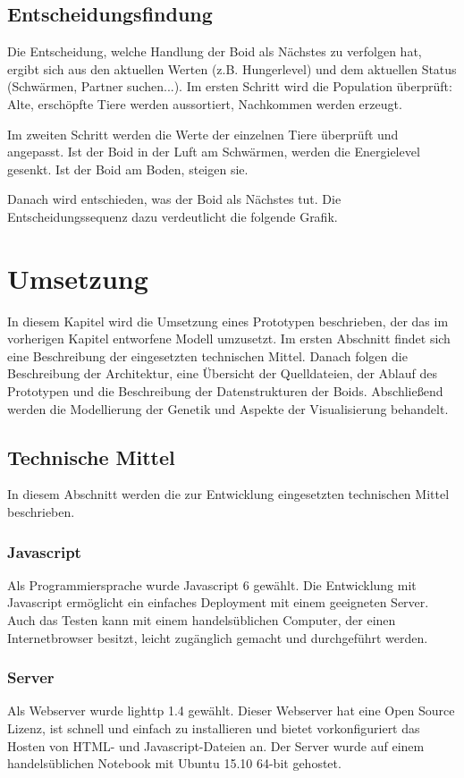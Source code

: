 \documentclass[draft=false
              ,paper=a4
              ,twoside=false
              ,fontsize=11pt
              ,headsepline
              ,BCOR10mm
              ,DIV11
              ,bibtotoc
              ,liststotoc
              ]{scrbook}
\begin{document}
\section{Entscheidungsfindung}
Die Entscheidung, welche Handlung der Boid als Nächstes zu verfolgen hat, ergibt sich aus den aktuellen Werten (z.B. Hungerlevel) und dem aktuellen Status (Schwärmen, Partner suchen...). Im ersten Schritt wird die Population überprüft: Alte, erschöpfte Tiere werden aussortiert, Nachkommen werden erzeugt.

Im zweiten Schritt werden die Werte der einzelnen Tiere überprüft und angepasst. Ist der Boid in der Luft am Schwärmen, werden die Energielevel gesenkt. Ist der Boid am Boden, steigen sie.

Danach wird entschieden, was der Boid als Nächstes tut. Die Entscheidungssequenz dazu verdeutlicht die folgende Grafik.

\chapter{Umsetzung}\label{umsetzung}
In diesem Kapitel wird die Umsetzung eines Prototypen beschrieben, der das im vorherigen Kapitel entworfene Modell umzusetzt. Im ersten Abschnitt findet sich eine Beschreibung der eingesetzten technischen Mittel. Danach folgen die Beschreibung der Architektur, eine Übersicht der Quelldateien, der Ablauf des Prototypen und die Beschreibung der Datenstrukturen der Boids. Abschließend werden die Modellierung der Genetik und Aspekte der Visualisierung behandelt.
\section{Technische Mittel}
In diesem Abschnitt werden die zur Entwicklung eingesetzten technischen Mittel beschrieben.
\subsection{Javascript}
Als Programmiersprache wurde Javascript 6 gewählt. Die Entwicklung mit Javascript ermöglicht ein einfaches Deployment mit einem geeigneten Server. Auch das Testen kann mit einem handelsüblichen Computer, der einen Internetbrowser besitzt, leicht zugänglich gemacht und durchgeführt werden.
\subsection{Server}
Als Webserver wurde lighttp 1.4 gewählt. Dieser Webserver hat eine Open Source Lizenz, ist schnell und einfach zu installieren und bietet vorkonfiguriert das Hosten von HTML- und Javascript-Dateien an. Der Server wurde auf einem handelsüblichen Notebook mit Ubuntu 15.10 64-bit gehostet.
\end{document}
